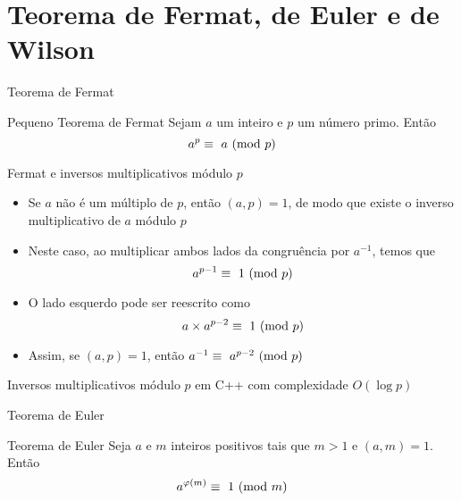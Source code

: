 \section{Teorema de Fermat, de Euler e de Wilson}

\begin{frame}[fragile]{Teorema de Fermat}

    \begin{block}{Pequeno Teorema de Fermat}
        Sejam $a$ um inteiro e $p$ um número primo. Então
        $$
            a^p\equiv\ \Mod{a}{p}
        $$
    \end{block}

\end{frame}

\begin{frame}[fragile]{Fermat e inversos multiplicativos módulo $p$}

    \begin{itemize}
        \item Se $a$ não é um múltiplo de $p$, então $(a, p) = 1$, de modo que existe o inverso
            multiplicativo de $a$ módulo $p$

        \item Neste caso, ao multiplicar ambos lados da congruência por $a^{-1}$, temos que
        $$
            a^{p - 1}\equiv\ \Mod{1}{p}
        $$

        \item O lado esquerdo pode ser reescrito como
        $$
            a\times a^{p - 2}\equiv\ \Mod{1}{p}
        $$

        \item Assim, se $(a, p) = 1$, então $a^{-1}\equiv\ a^{p - 2}\ (\mbox{mod}\ p)$
    \end{itemize}

\end{frame}

\begin{frame}[fragile]{Inversos multiplicativos módulo $p$ em C++ com complexidade $O(\log p)$}
\end{frame}

\begin{frame}[fragile]{Teorema de Euler}

    \begin{block}{Teorema de Euler}
        Seja $a$ e $m$ inteiros positivos tais que $m > 1$ e $(a, m) = 1$. Então
        $$
            a^{\varphi(m)}\equiv\ \Mod{1}{m}
        $$
    \end{block}

\end{frame}

